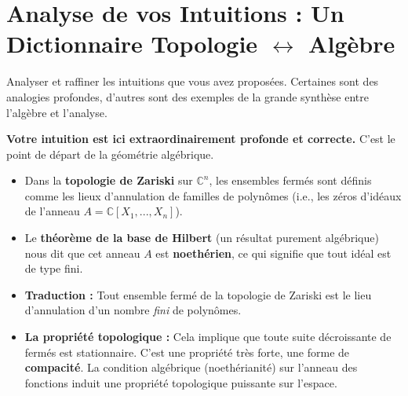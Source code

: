 \section{Analyse de vos Intuitions : Un Dictionnaire Topologie $\leftrightarrow$ Algèbre}

\begin{objectif}
    Analyser et raffiner les intuitions que vous avez proposées. Certaines sont des analogies profondes, d'autres sont des exemples de la grande synthèse entre l'algèbre et l'analyse.
\end{objectif}

\begin{proposition}
    \textbf{Votre intuition est ici extraordinairement profonde et correcte.} C'est le point de départ de la géométrie algébrique.
    \begin{itemize}
        \item Dans la \textbf{topologie de Zariski} sur $\mathbb{C}^n$, les ensembles fermés sont définis comme les lieux d'annulation de familles de polynômes (i.e., les zéros d'idéaux de l'anneau $A = \mathbb{C}[X_1, ..., X_n]$).
        \item Le \textbf{théorème de la base de Hilbert} (un résultat purement algébrique) nous dit que cet anneau $A$ est \textbf{noethérien}, ce qui signifie que tout idéal est de type fini.
        \item \textbf{Traduction :} Tout ensemble fermé de la topologie de Zariski est le lieu d'annulation d'un nombre \textit{fini} de polynômes.
        \item \textbf{La propriété topologique :} Cela implique que toute suite décroissante de fermés est stationnaire. C'est une propriété très forte, une forme de \textbf{compacité}. La condition algébrique (noethérianité) sur l'anneau des fonctions induit une propriété topologique puissante sur l'espace.
    \end{itemize}
\end{proposition}

